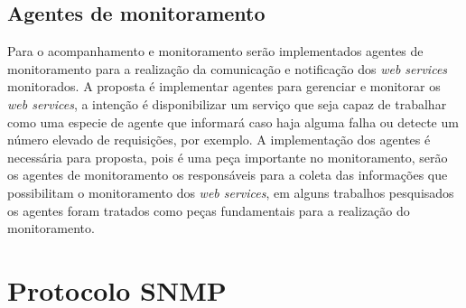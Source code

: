 \subsection{Agentes de monitoramento}

Para o acompanhamento e monitoramento serão implementados agentes de monitoramento para a realização da comunicação e notificação dos \textit{web services} monitorados. A proposta é implementar agentes para gerenciar e monitorar os \textit{web services}, a intenção é disponibilizar um serviço que seja capaz de trabalhar como uma especie de agente que informará caso haja alguma falha ou detecte um número elevado de requisições, por exemplo. A implementação dos agentes é necessária para proposta, pois é uma peça importante no monitoramento, serão os agentes de monitoramento os responsáveis para a coleta das informações que possibilitam o monitoramento dos \textit{web services}, em alguns trabalhos pesquisados os agentes foram tratados como peças fundamentais para a realização do monitoramento.       


\section{Protocolo SNMP}

